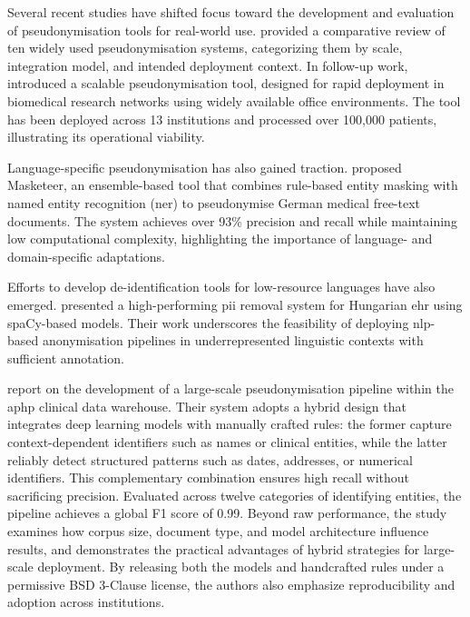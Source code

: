 Several recent studies have shifted focus toward the development and evaluation of pseudonymisation tools for real-world use. \citet{abuattieh2025tools} provided a comparative review of ten widely used pseudonymisation systems, categorizing them by scale, integration model, and intended deployment context. In follow-up work, \citet{attieh2024orchestra} introduced a scalable pseudonymisation tool, designed for rapid deployment in biomedical research networks using widely available office environments. The tool has been deployed across 13 institutions and processed over 100,000 patients, illustrating its operational viability.

Language-specific pseudonymisation has also gained traction. \citet{baumgartner2024masketeer} proposed Masketeer, an ensemble-based tool that combines rule-based entity masking with named entity recognition (\gls{ner}) to pseudonymise German medical free-text documents. The system achieves over 93\% precision and recall while maintaining low computational complexity, highlighting the importance of language- and domain-specific adaptations.

Efforts to develop de-identification tools for low-resource languages have also emerged. \citet{berzi2025hungarian} presented a high-performing \gls{pii} removal system for Hungarian \gls{ehr} using spaCy-based models. Their work underscores the feasibility of deploying \gls{nlp}-based anonymisation pipelines in underrepresented linguistic contexts with sufficient annotation.

\citet{tannier2024aphp} report on the development of a large-scale pseudonymisation pipeline within the \gls{aphp} clinical data warehouse. Their system adopts a hybrid design that integrates deep learning models with manually crafted rules: the former capture context-dependent identifiers such as names or clinical entities, while the latter reliably detect structured patterns such as dates, addresses, or numerical identifiers. This complementary combination ensures high recall without sacrificing precision. Evaluated across twelve categories of identifying entities, the pipeline achieves a global F1 score of 0.99. Beyond raw performance, the study examines how corpus size, document type, and model architecture influence results, and demonstrates the practical advantages of hybrid strategies for large-scale deployment. By releasing both the models and handcrafted rules under a permissive BSD 3-Clause license, the authors also emphasize reproducibility and adoption across institutions.

